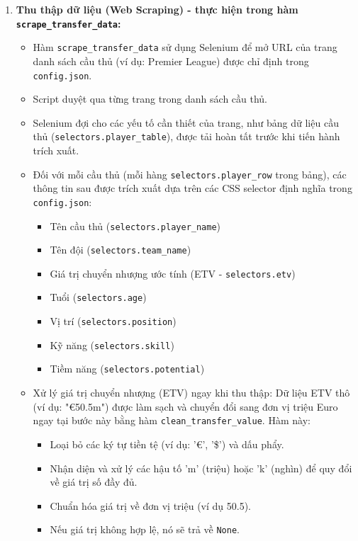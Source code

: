 \documentclass[12pt, a4paper]{report}
\begin{document}
\begin{enumerate}[label=\textbf{Bước \arabic*:}, leftmargin=* , itemsep=1ex]
    \item \textbf{Thu thập dữ liệu (Web Scraping) - thực hiện trong hàm \texttt{scrape\_transfer\_data}:}
    \begin{itemize}[leftmargin=0em]
        \item Hàm \texttt{scrape\_transfer\_data} sử dụng Selenium để mở URL của trang danh sách cầu thủ (ví dụ: Premier League) được chỉ định trong \texttt{config.json}.
        \item Script duyệt qua từng trang trong danh sách cầu thủ.
        \item Selenium đợi cho các yếu tố cần thiết của trang, như bảng dữ liệu cầu thủ (\texttt{selectors.player\_table}), được tải hoàn tất trước khi tiến hành trích xuất.
        \item Đối với mỗi cầu thủ (mỗi hàng \texttt{selectors.player\_row} trong bảng), các thông tin sau được trích xuất dựa trên các CSS selector định nghĩa trong \texttt{config.json}:
        \begin{itemize}
            \item Tên cầu thủ (\texttt{selectors.player\_name})
            \item Tên đội (\texttt{selectors.team\_name})
            \item Giá trị chuyển nhượng ước tính (ETV - \texttt{selectors.etv})
            \item Tuổi (\texttt{selectors.age})
            \item Vị trí (\texttt{selectors.position})
            \item Kỹ năng (\texttt{selectors.skill})
            \item Tiềm năng (\texttt{selectors.potential})
        \end{itemize}
        \item Xử lý giá trị chuyển nhượng (ETV) ngay khi thu thập: Dữ liệu ETV thô (ví dụ: "€50.5m") được làm sạch và chuyển đổi sang đơn vị triệu Euro ngay tại bước này bằng hàm \texttt{clean\_transfer\_value}. Hàm này:
        \begin{itemize}
            \item Loại bỏ các ký tự tiền tệ (ví dụ: '€', '\$') và dấu phẩy.
            \item Nhận diện và xử lý các hậu tố 'm' (triệu) hoặc 'k' (nghìn) để quy đổi về giá trị số đầy đủ.
            \item Chuẩn hóa giá trị về đơn vị triệu (ví dụ 50.5).
            \item Nếu giá trị không hợp lệ, nó sẽ trả về \texttt{None}.

\end{itemize}
\end{itemize}
\end{enumerate}
\end{document}
